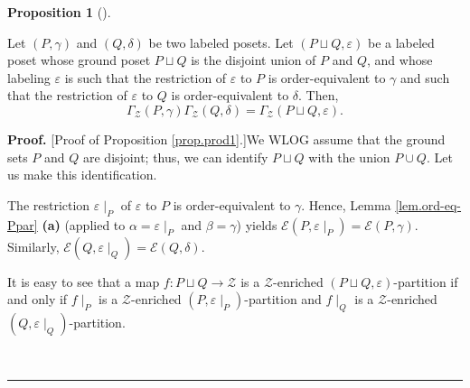 \documentclass[numbers=enddot,12pt,final,onecolumn,notitlepage]{scrartcl}%
\theoremstyle{definition}
\newtheorem{prop}[theo]{Proposition}
\newenvironment{proposition}[1][]
{\begin{prop}[#1]\begin{leftbar}}
{\end{leftbar}\end{prop}}
\newenvironment{proof}[1][Proof]{\noindent\textbf{#1.} }{\ \rule{0.5em}{0.5em}}
\newenvironment{vershort}{}{}
\begin{document}
\begin{proposition}
\label{prop.prod1}Let $\left(  P,\gamma\right)  $ and $\left(  Q,\delta
\right)  $ be two labeled posets. Let $\left(  P\sqcup Q,\varepsilon\right)  $
be a labeled poset whose ground poset $P\sqcup Q$ is the disjoint union of $P$
and $Q$, and whose labeling $\varepsilon$ is such that the restriction of
$\varepsilon$ to $P$ is order-equivalent to $\gamma$ and such that the
restriction of $\varepsilon$ to $Q$ is order-equivalent to $\delta$. Then,%
\[
\Gamma_{\mathcal{Z}}\left(  P,\gamma\right)  \Gamma_{\mathcal{Z}}\left(
Q,\delta\right)  =\Gamma_{\mathcal{Z}}\left(  P\sqcup Q,\varepsilon\right)  .
\]

\end{proposition}

\begin{proof}
[Proof of Proposition \ref{prop.prod1}.]We WLOG assume that the ground sets
$P$ and $Q$ are disjoint; thus, we can identify $P\sqcup Q$ with the union
$P\cup Q$.
Let us make this identification.

The restriction $\varepsilon\mid_P$ of $\varepsilon$ to $P$ is order-equivalent
to $\gamma$. Hence, Lemma \ref{lem.ord-eq-Ppar} \textbf{(a)} (applied to
$\alpha = \varepsilon\mid_P$ and $\beta = \gamma$) yields
$\mathcal{E}\left(P, \varepsilon\mid_P\right)
= \mathcal{E}\left(P, \gamma\right)$.
Similarly,
$\mathcal{E}\left(Q, \varepsilon\mid_Q\right)
= \mathcal{E}\left(Q, \delta\right)$.

\begin{vershort}
It is easy to see that a map $f : P \sqcup Q \to \mathcal{Z}$
is a $\mathcal{Z}$-enriched $\left(P \sqcup Q, \varepsilon\right)$-partition
if and only if $f \mid_P$ is a $\mathcal{Z}$-enriched
$\left(  P,\varepsilon\mid_P\right)$-partition and
$f \mid_Q$ is a $\mathcal{Z}$-enriched
$\left(  Q,\varepsilon\mid_Q\right)$-partition.
\end{vershort}


\end{proof}
\end{document}
